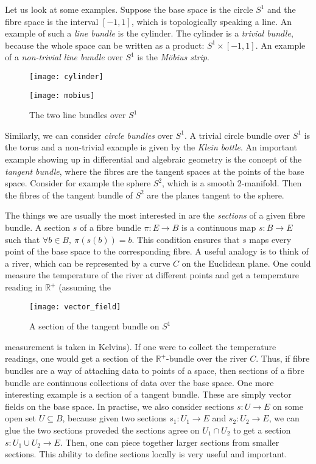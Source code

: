 Let us look at some examples. Suppose the base space is the circle $S^{1}$
and the fibre space is the interval $[-1, 1]$, which is topologically
speaking a line. An example of such a \emph{line bundle} is the cylinder.
The cylinder is a \emph{trivial bundle}, because the whole space can
be written as a product: $S^{1}\times [-1,1]$. An example of a
\emph{non-trivial line bundle} over $S^{1}$ is the \emph{Möbius strip}.
\begin{figure}[H]
  \centering
  \begin{minipage}{.45\textwidth}
    \centering
    \texttt{[image: cylinder]}
  \end{minipage}%
  \begin{minipage}{.45\textwidth}
    \centering
    \texttt{[image: mobius]}
  \end{minipage}
  \caption{The two line bundles over $S^{1}$}
\end{figure}
Similarly, we can consider \emph{circle bundles} over $S^{1}$. A trivial
circle bundle over $S^{1}$ is the torus and a non-trivial example is given
by the \emph{Klein bottle}.
An important example showing up in differential and algebraic geometry
is the concept of the \emph{tangent bundle}, where the fibres are the
tangent spaces at the points of the base space. Consider for example the
sphere $S^{2}$, which is a smooth 2-manifold. Then the fibres of the tangent
bundle of $S^{2}$ are the planes tangent to the sphere.

The things we are usually the most interested in are the \emph{sections} of
a given fibre bundle. A section $s$ of a fibre bundle $\pi:E\to B$
is a continuous map $s:B\to E$ such that $\forall b\in B,\ \pi(s(b))=b$.
This condition ensures that $s$ maps every point of the base space to the
corresponding fibre. A useful analogy is to think of a river, which can
be represented by a curve $C$ on the Euclidean plane. One could measure the
temperature of the river at different points and get a temperature reading
in $\mathbb{R}^{+}$ (assuming the
\begin{wrapfigure}{r}{0.3\textwidth}
  \centering
  \texttt{[image: vector\_field]}
  \caption{A section of the tangent bundle on $S^{1}$}
\end{wrapfigure}
 measurement is taken in Kelvins).
If one were to collect the temperature readings, one would get a section of
the $\mathbb{R}^{+}$-bundle over the river $C$. Thus, if fibre bundles are a
way of attaching data to points of a space, then sections of a fibre bundle
are continuous collections of data over the base space.
One more interesting example is a section of a tangent bundle. These are
simply vector fields on the base space.
In practise, we also consider sections $s:U\to E$ on some open set
$U\subseteq B$, because given two sections $s_{1}:U_{1}\to E$ and
$s_{2}:U_{2}\to E$, we can glue the two sections proveded the sections
agree on $U_{1}\cap U_{2}$ to get a section $s:U_{1}\cup U_{2}\to E$.
Then, one can piece together larger sections from smaller sections. This
ability to define sections locally is very useful and important.

